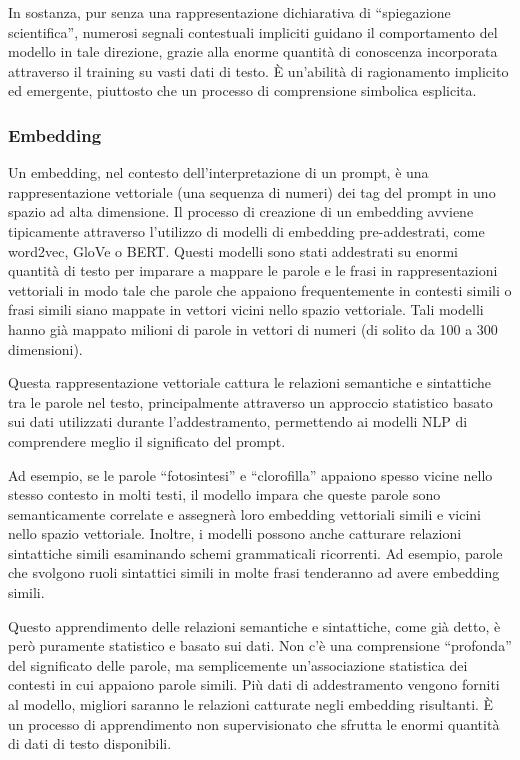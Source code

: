             In sostanza, pur senza una rappresentazione dichiarativa di ``spiegazione scientifica'', numerosi segnali contestuali impliciti guidano il comportamento del modello in tale direzione, grazie alla enorme quantità di conoscenza incorporata attraverso il training su vasti dati di testo. È un'abilità di ragionamento implicito ed emergente, piuttosto che un processo di comprensione simbolica esplicita.
            
        \subsubsection{Embedding}
            Un embedding, nel contesto dell'interpretazione di un prompt, è una rappresentazione vettoriale (una sequenza di numeri) dei tag del prompt in uno spazio ad alta dimensione. Il processo di creazione di un embedding avviene tipicamente attraverso l'utilizzo di modelli di embedding pre-addestrati, come word2vec, GloVe o BERT. Questi modelli sono stati addestrati su enormi quantità di testo per imparare a mappare le parole e le frasi in rappresentazioni vettoriali in modo tale che parole che appaiono frequentemente in contesti simili o frasi simili siano mappate in vettori vicini nello spazio vettoriale. Tali modelli hanno già mappato milioni di parole in vettori di numeri (di solito da 100 a 300 dimensioni).

            Questa rappresentazione vettoriale cattura le relazioni semantiche e sintattiche tra le parole nel testo, principalmente attraverso un approccio statistico basato sui dati utilizzati durante l’addestramento, permettendo ai modelli NLP di comprendere meglio il significato del prompt.
            
            Ad esempio, se le parole ``fotosintesi'' e ``clorofilla'' appaiono spesso vicine nello stesso contesto in molti testi, il modello impara che queste parole sono semanticamente correlate e assegnerà loro embedding vettoriali simili e vicini nello spazio vettoriale. Inoltre, i modelli possono anche catturare relazioni sintattiche simili esaminando schemi grammaticali ricorrenti. Ad esempio, parole che svolgono ruoli sintattici simili in molte frasi tenderanno ad avere embedding simili.
            
            Questo apprendimento delle relazioni semantiche e sintattiche, come già detto, è però puramente statistico e basato sui dati. Non c'è una comprensione ``profonda'' del significato delle parole, ma semplicemente un'associazione statistica dei contesti in cui appaiono parole simili. Più dati di addestramento vengono forniti al modello, migliori saranno le relazioni catturate negli embedding risultanti. È un processo di apprendimento non supervisionato che sfrutta le enormi quantità di dati di testo disponibili.
            
